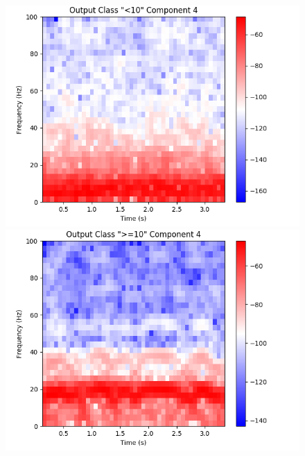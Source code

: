 \documentclass[fleqn,10pt]{wlscirep}
\begin{document}
\begin{figure}
  \begin{minipage}{0.24\textwidth}
    \includegraphics[width=\linewidth]{max_act/artificial_spec_4_0.png}
    \subcaption{}
  \end{minipage}
  \hspace*{\fill} 
  \begin{minipage}{0.24\textwidth}
    \includegraphics[width=\linewidth]{max_act/artificial_spec_4_1.png}
    \subcaption{}
  \end{minipage}
  \begin{minipage}{0.24\textwidth}

\end{minipage}
\end{figure}
\end{document}
